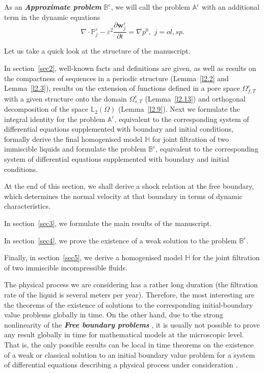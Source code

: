 \documentclass{article}
\theoremstyle{plain}
\theoremstyle{definition}
\numberwithin{equation}{section}
\begin{document}
As an \textbf{\emph{Approximate problem}} $\mathbb{B}^{\varepsilon}$, we will call the problem $\mathbb{A}^{\varepsilon}$ with an additional term in the dynamic equations
\begin{equation}\label{eq1.9}
\nabla\cdot\mathbb{P}^{\varepsilon}_{j}-\varepsilon^{2}
\frac{\partial\boldsymbol{w}^{\varepsilon}_{j}}{\partial{t}}=\nabla{p}^{0},\,\,j=ol, sp.
\end{equation}

Let us take a quick look at the structure of the manuscript.

In section~\ref{sec2}, well-known facts and definitions are given, as well as results on the compactness of sequences in a periodic structure (Lemma~\ref{l2.2} and Lemma~\ref{l2.3}), results on the extension of functions defined in a pore space $\Omega^{\varepsilon}_{f,T}$ with a given structure onto the domain $\Omega^{\varepsilon}_{s,T}$ (Lemma~\ref{l2.13}) and orthogonal decomposition of the space $\mathbb{L}_{2}(\Omega)$ (Lemma~\ref{l2.9}). Next we formulate the integral identity for the problem $\mathbb{A}^{\varepsilon}$, equivalent to the corresponding system of differential equations supplemented with boundary and initial conditions, formally derive the final homogenised model $\mathbb{H}$ for joint filtration of two immiscible liquids and formulate the problem $\mathbb{B}^{\varepsilon}$, equivalent to the corresponding system of differential equations supplemented with boundary and initial conditions. 

At the end of this section, we shall derive a shock relation at the free boundary, which determines the normal velocity at that boundary in terms of dynamic characteristics.
 
In section~\ref{sec3}, we formulate the main results of the manuscript.

In section~\ref{sec4}, we prove the existence of a weak solution to the problem $\mathbb{B}^{\varepsilon}$.

Finally, in section~\ref{sec5}, we derive a homogenised model $\mathbb{H}$ for the joint filtration of two immiscible incompressible fluids.

The physical process we are considering has a rather long duration (the filtration rate of the liquid is several meters per year). Therefore, the most interesting are the theorems of the existence of solutions to the corresponding initial-boundary value problems globally in time. On the other hand, due to the strong nonlinearity of the \textbf{\emph{Free boundary problems}} \cite{15}, it is usually not possible to prove any result globally in time for mathematical models at the microscopic level. That is, the only possible results can be local in time theorems on the existence of a weak or classical solution to an initial boundary value problem for a system of differential equations describing a physical process under consideration \cite{15}.
\end{document}
